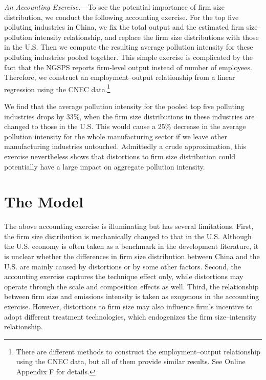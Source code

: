 \documentclass[AEJ]{AEA}
\begin{document}
\textit{An Accounting Exercise.---}To see the potential importance of firm size distribution, we conduct the following accounting exercise. For the top five polluting industries in China, we fix the total output and  the estimated firm size--pollution intensity relationship, and replace the firm size distributions with those in the U.S. Then we compute the resulting average pollution intensity for these polluting industries pooled together. This simple exercise is complicated by the fact that the NGSPS reports firm-level output instead of number of employees. Therefore, we construct an employment--output relationship from a linear regression using the CNEC data.\footnote{There are different methods to construct the employment--output relationship using the CNEC data, but all of them provide similar results. See Online Appendix F for details.}

We find that the average pollution intensity for the pooled top five polluting industries drops by 33\%, when the firm size distributions in these industries are changed to those in the U.S. This would cause a 25\% decrease in the average pollution intensity for the whole manufacturing sector if we leave other manufacturing industries untouched. Admittedly a crude approximation, this exercise nevertheless shows that distortions to firm size distribution could potentially have a large impact on aggregate pollution intensity.

\section{The Model}

The above accounting exercise is illuminating but has several limitations. First, the firm size distribution is mechanically changed to that in the U.S. Although the U.S. economy is often taken as a benchmark in the development literature, it is unclear whether the differences in firm size distribution between China and the U.S. are mainly caused by distortions or by some other factors. Second, the accounting exercise captures the technique effect only, while distortions may operate through the scale and composition effects as well. Third, the relationship between firm size and emissions intensity is taken as exogenous in the accounting exercise. However, distortions to firm size may also influence firm's incentive to adopt different treatment technologies, which endogenizes the firm size--intensity relationship.
\end{document}
